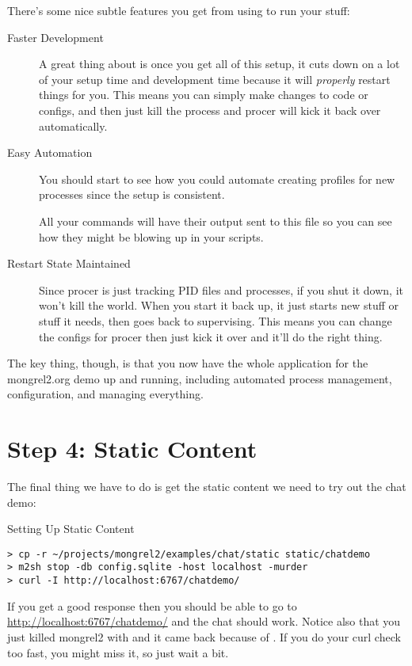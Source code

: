 There's some nice subtle features you get from using 
to run your stuff:

\begin{description}
\item [Faster Development]  A great thing about  is once you get all of this setup,
    it cuts down on a lot of your setup time and development time because
    it will \emph{properly} restart things for you.  This means you can
    simply make changes to code or configs, and then just kill the process and
    procer will kick it back over automatically.
\item [Easy Automation]  You should start to see how you could automate creating
    profiles for new processes since the setup is consistent.
  \item []  All your commands will have their output sent to
    this file so you can see how they might be blowing up in your scripts.
\item [Restart State Maintained]  Since procer is just tracking PID files and
    processes, if you shut it down, it won't kill the world.  When you start
    it back up, it just starts new stuff or stuff it needs, then goes back to
    supervising.  This means you can change the configs for procer then just
    kick it over and it'll do the right thing.
\end{description}

The key thing, though, is that you now have the whole application for
the mongrel2.org demo up and running, including automated process management,
configuration, and managing everything.

\section{Step 4: Static Content}

The final thing we have to do is get the static content we need to try
out the chat demo:

\begin{code}{Setting Up Static Content}
\begin{lstlisting}
> cp -r ~/projects/mongrel2/examples/chat/static static/chatdemo
> m2sh stop -db config.sqlite -host localhost -murder
> curl -I http://localhost:6767/chatdemo/
\end{lstlisting}
\end{code}

If you get a good response then you should be able to go to
\url{http://localhost:6767/chatdemo/} and the chat should work.  Notice
also that you just killed mongrel2 with  and it came back
because of .  If you do your curl check too fast,
you might miss it, so just wait a bit.

